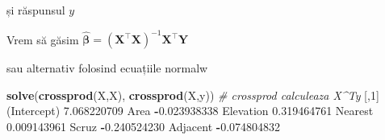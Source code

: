 \documentclass[]{article}
\newenvironment{Shaded}{\begin{snugshade}}{\end{snugshade}}
\newcommand{\KeywordTok}[1]{\textcolor[rgb]{0.13,0.29,0.53}{\textbf{#1}}}
\newcommand{\DecValTok}[1]{\textcolor[rgb]{0.00,0.00,0.81}{#1}}
\newcommand{\FloatTok}[1]{\textcolor[rgb]{0.00,0.00,0.81}{#1}}
\newcommand{\StringTok}[1]{\textcolor[rgb]{0.31,0.60,0.02}{#1}}
\newcommand{\CommentTok}[1]{\textcolor[rgb]{0.56,0.35,0.01}{\textit{#1}}}
\newcommand{\OperatorTok}[1]{\textcolor[rgb]{0.81,0.36,0.00}{\textbf{#1}}}
\newcommand{\NormalTok}[1]{#1}
\begin{document}
și răspunsul \(y\)

\begin{Shaded}
\end{Shaded}

Vrem să găsim
\(\hat{\boldsymbol{\beta}}=(\mathbf{X}^\intercal\mathbf{X})^{-1}\mathbf{X}^\intercal\mathbf{Y}\)

\begin{Shaded}
\end{Shaded}

sau alternativ folosind ecuațiile normalw

\begin{Shaded}
\begin{Highlighting}[]
\KeywordTok{solve}\NormalTok{(}\KeywordTok{crossprod}\NormalTok{(X,X), }\KeywordTok{crossprod}\NormalTok{(X,y)) }\CommentTok{# crossprod calculeaza X^Ty}
\NormalTok{                    [,}\DecValTok{1}\NormalTok{]}
\NormalTok{(Intercept)  }\FloatTok{7.068220709}
\NormalTok{Area        }\OperatorTok{-}\FloatTok{0.023938338}
\NormalTok{Elevation    }\FloatTok{0.319464761}
\NormalTok{Nearest      }\FloatTok{0.009143961}
\NormalTok{Scruz       }\OperatorTok{-}\FloatTok{0.240524230}
\NormalTok{Adjacent    }\OperatorTok{-}\FloatTok{0.074804832}
\end{Highlighting}
\end{Shaded}
\end{document}
